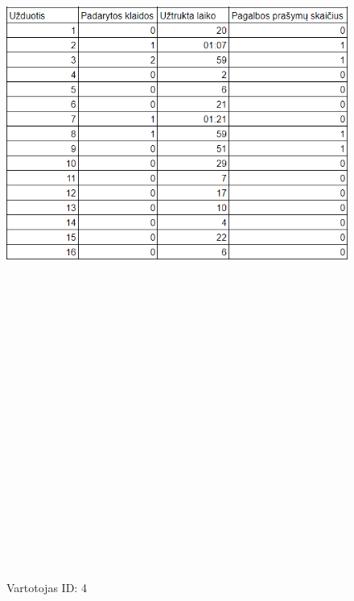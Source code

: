 \documentclass[oneside]{VUMIFPSkursinis}
\begin{document}
	\begin{figure}[ht]
			\centering
			\includegraphics[width=15cm,height=60cm,keepaspectratio]{4.png}
			\caption{ Vartotojas ID: 4}
	\end{figure}
\pagebreak
\end{document}
